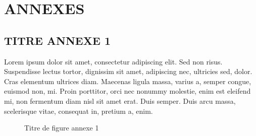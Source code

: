 \chapter*{ANNEXES}
\adjustmtc
\thispagestyle{MyStyle}

\makeatletter\renewcommand{}\makeatother


\appendix
\renewcommand{\thefigure}{A.\arabic{figure}}
\setcounter{figure}{0}
\section{TITRE ANNEXE 1}
Lorem ipsum dolor sit amet, consectetur adipiscing elit. Sed non risus. Suspendisse lectus tortor, dignissim sit amet, adipiscing nec, ultricies sed, dolor. Cras elementum ultrices diam. Maecenas ligula massa, varius a, semper congue, euismod non, mi. Proin porttitor, orci nec nonummy molestie, enim est eleifend mi, non fermentum diam nisl sit amet erat. Duis semper. Duis arcu massa, scelerisque vitae, consequat in, pretium a, enim.\par
\begin{figure}[H]%
    \center%
    \setlength{\fboxsep}{5pt}%
    \setlength{\fboxrule}{0.5pt}%
    \caption{Titre de figure annexe 1}%
\end{figure}

